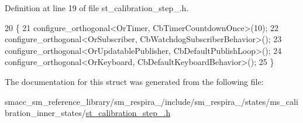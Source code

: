 Definition at line 19 of file st\+\_\+calibration\+\_\+step\+\_.\+h.


\begin{DoxyCode}
20     \{
21         configure\_orthogonal<OrTimer, CbTimerCountdownOnce>(10);
22         configure\_orthogonal<OrSubscriber, CbWatchdogSubscriberBehavior>();
23         configure\_orthogonal<OrUpdatablePublisher, CbDefaultPublishLoop>();
24         configure\_orthogonal<OrKeyboard, CbDefaultKeyboardBehavior>();
25     \}
\end{DoxyCode}


The documentation for this struct was generated from the following file\+:\begin{DoxyCompactItemize}
\item 
smacc\+\_\+sm\+\_\+reference\+\_\+library/sm\+\_\+respira\+\_/include/sm\+\_\+respira\+\_/states/ms\+\_\+calibration\+\_\+inner\+\_\+states/\hyperlink{st__calibration__step__1_8h}{st\+\_\+calibration\+\_\+step\+\_.\+h}\end{DoxyCompactItemize}
